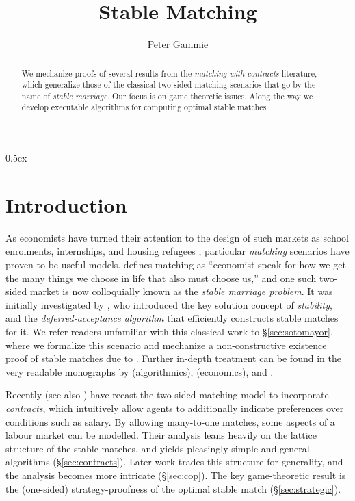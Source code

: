 \documentclass[11pt,a4paper]{article}
\begin{document}
\parindent 0pt\parskip 0.5ex

\title{Stable Matching}
\author{Peter Gammie}
\maketitle

\begin{abstract}
  \noindent We mechanize proofs of several results from the
  \emph{matching with contracts} literature, which generalize those of
  the classical two-sided matching scenarios that go by the name of
  \emph{stable marriage}. Our focus is on game theoretic issues. Along
  the way we develop executable algorithms for computing optimal
  stable matches.
\end{abstract}

\tableofcontents


\section{Introduction}
\label{sec:introduction}

As economists have turned their attention to the design of such
markets as school enrolments, internships, and housing refugees
\citep{AnderssonEhlers:2016}, particular \emph{matching} scenarios
have proven to be useful models. \citet{Roth:2015} defines matching as
``economist-speak for how we get the many things we choose in life
that also must choose us,'' and one such two-sided market is now
colloquially known as the
\href{https://en.wikipedia.org/wiki/Stable_marriage_problem}{\emph{stable
    marriage problem}}.  It was initially investigated by
\citet{GaleShapley:1962}, who introduced the key solution concept of
\emph{stability}, and the \emph{deferred-acceptance algorithm} that
efficiently constructs stable matches for it. We refer readers
unfamiliar with this classical work to \S\ref{sec:sotomayor}, where we
formalize this scenario and mechanize a non-constructive existence
proof of stable matches due to \citet{Sotomayor:1996}. Further
in-depth treatment can be found in the very readable monographs by
\citet{GusfieldIrving:1989} (algorithmics), \citet{RothSotomayor:1990}
(economics), and \citet{Manlove:2013}.

Recently \citet{HatfieldMilgrom:2005} (see also
\citet{Fleiner:2000,Fleiner:2002,Fleiner:2003}) have recast the
two-sided matching model to incorporate \emph{contracts}, which
intuitively allow agents to additionally indicate preferences over
conditions such as salary. By allowing many-to-one matches, some
aspects of a labour market can be modelled. Their analysis leans
heavily on the lattice structure of the stable matches, and yields
pleasingly simple and general algorithms
(\S\ref{sec:contracts}). Later work trades this structure for
generality, and the analysis becomes more intricate
(\S\ref{sec:cop}). The key game-theoretic result is the (one-sided)
strategy-proofness of the optimal stable match
(\S\ref{sec:strategic}).
\end{document}
